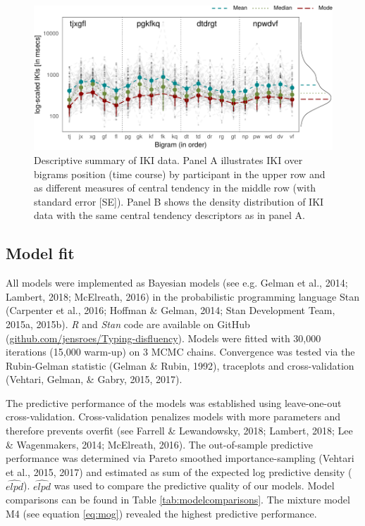 \documentclass[english,man,floatsintext]{apa7}
\begin{document}
\begin{figure}[!ht]

{\centering \includegraphics{report_files/figure-latex/descriptives-1} 

}

\caption{Descriptive summary of IKI data. Panel A illustrates IKI over bigrams position (time course) by participant in the upper row and as different measures of central tendency in the middle row (with standard error [SE]). Panel B shows the density distribution of IKI data with the same central tendency descriptors as in panel A.}\label{fig:descriptives}
\end{figure}

\hypertarget{model-fit}{%
\subsection{Model fit}\label{model-fit}}

All models were implemented as Bayesian models (see e.g. Gelman et al., 2014; Lambert, 2018; McElreath, 2016) in the probabilistic programming language Stan (Carpenter et al., 2016; Hoffman \& Gelman, 2014; Stan Development Team, 2015a, 2015b). \textit{R} and \textit{Stan} code are available on GitHub (\href{https://github.com/jensroes/Typing-disfluency}{github.com/jensroes/Typing-disfluency}). Models were fitted with 30,000 iterations (15,000 warm-up) on 3 MCMC chains. Convergence was tested via the Rubin-Gelman statistic (Gelman \& Rubin, 1992), traceplots and cross-validation (Vehtari, Gelman, \& Gabry, 2015, 2017).

The predictive performance of the models was established using leave-one-out cross-validation. Cross-validation penalizes models with more parameters and therefore prevents overfit (see Farrell \& Lewandowsky, 2018; Lambert, 2018; Lee \& Wagenmakers, 2014; McElreath, 2016). The out-of-sample predictive performance was determined via Pareto smoothed importance-sampling (Vehtari et al., 2015, 2017) and estimated as sum of the expected log predictive density (\(\widehat{elpd}\)). \(\widehat{elpd}\) was used to compare the predictive quality of our models. Model comparisons can be found in Table \ref{tab:modelcomparisons}. The mixture model M4 (see equation \ref{eq:mog}) revealed the highest predictive performance.
\end{document}
